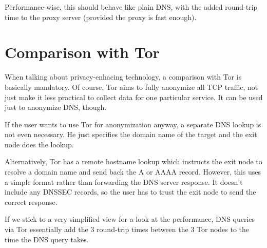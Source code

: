 Performance-wise, this should behave like plain DNS, with the added round-trip
time to the proxy server (provided the proxy is fast enough).

\section{Comparison with Tor}
When talking about privacy-enhacing technology, a comparison with Tor is
basically mandatory. Of course, Tor aims to fully anonymize all TCP traffic, not
just make it less practical to collect data for one particular service. It can
be used just to anonymize DNS, though.

If the user wants to use Tor for anonymization anyway, a separate DNS lookup is
not even necessary. He just specifies the domain name of the target and the exit
node does the lookup.

Alternatively, Tor has a remote hostname lookup which instructs the exit node to
resolve a domain name and send back the A or AAAA record. However, this uses a
simple format rather than forwarding the DNS server response. It doesn't include
any DNSSEC records, so the user has to trust the exit node to send the correct
response.

If we stick to a very simplified view for a look at the performance, DNS queries
via Tor essentially add the 3 round-trip times between the 3 Tor nodes to the
time the DNS query takes.

